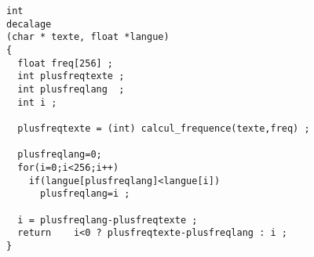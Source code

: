\ifcorrection
\begin{correction}
\begin{verbatim}
int
decalage
(char * texte, float *langue)
{
  float freq[256] ;
  int plusfreqtexte ;
  int plusfreqlang  ;
  int i ;

  plusfreqtexte = (int) calcul_frequence(texte,freq) ;
  
  plusfreqlang=0;
  for(i=0;i<256;i++)
    if(langue[plusfreqlang]<langue[i])
      plusfreqlang=i ;

  i = plusfreqlang-plusfreqtexte ;
  return    i<0 ? plusfreqtexte-plusfreqlang : i ;
}
\end{verbatim}
\end{correction}
\fi
